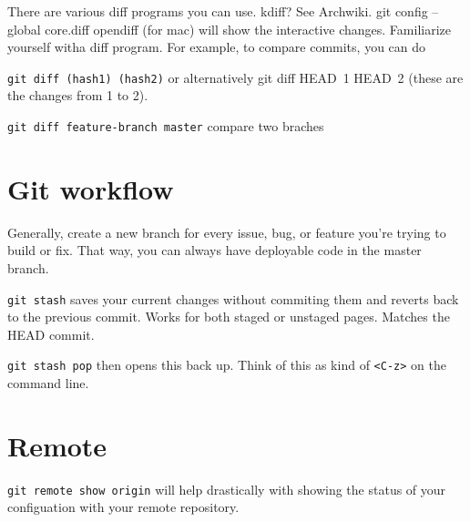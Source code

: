 \documentclass{article}
\begin{document}
There are various diff programs you can use. kdiff? See Archwiki.
git config --global core.diff opendiff (for mac) will show the interactive changes. Familiarize yourself witha diff program. For example, to compare commits, you can do 

\verb|git diff (hash1) (hash2)| or alternatively git diff HEAD~1 HEAD~2 (these are the changes from 1 to 2).

\verb|git diff feature-branch master| compare two braches

\section{Git workflow}
Generally, create a new branch for every issue, bug, or feature you're trying
to build or fix. That way, you can always have deployable code in the master
branch. 

\verb|git stash| saves your current changes without commiting them and reverts back to the previous commit. Works for both staged or unstaged pages. Matches the HEAD commit.

\verb|git stash pop| then opens this back up. Think of this as kind of \verb|<C-z>| on the command line.


\section{Remote}
\verb|git remote show origin| will help drastically with showing the status of your configuation with your remote repository.
\end{document}
